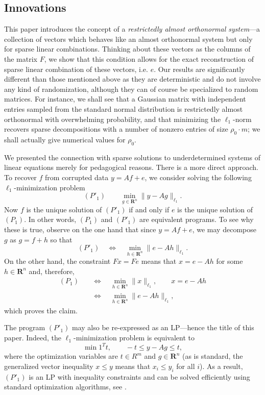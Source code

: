 \documentclass[11pt]{article}
\def\R{{{\mathbf{R}}}} %
\def\emph#1{{\it #1}} \def\textbf#1{{\bf #1}}
\newcommand{\<}{\langle}
\renewcommand{\>}{\rangle}
\numberwithin{equation}{section}
\begin{document}
\subsection{Innovations}


This paper introduces the concept of a \emph{restrictedly almost
  orthonormal system}---a collection of vectors which behaves like an
almost orthonormal system but only for sparse linear combinations.
Thinking about these vectors as the columns of the matrix $F$, we show
that this condition allows for the exact reconstruction of sparse
linear combination of these vectors, i.e. $e$. Our results are
significantly different than those mentioned above as they are
deterministic and do not involve any kind of randomization, although
they can of course be specialized to random matrices.  For instance,
we shall see that a Gaussian matrix with independent entries sampled
from the standard normal distribution is restrictedly almost
orthonormal with overwhelming probability, and that minimizing the
$\ell_1$-norm recovers sparse decompositions with a number of nonzero
entries of size $\rho_0 \cdot m$; we shall actually give numerical
values for $\rho_0$.

We presented the connection with sparse solutions to underdetermined
systems of linear equations merely for pedagogical reasons. There is a
more direct approach. To recover $f$ from corrupted data $y = Af + e$,
we consider solving the following $\ell_1$-minimization problem
\begin{equation}
  \label{eq:P1a}
  (P'_1) \quad \quad  \min_{g \in \R^n} \|y - A g\|_{\ell_1}.
\end{equation}
Now $f$ is the unique solution of $(P'_1)$ if and only if $e$ is the
unique solution of $(P_1)$. In other words, $(P_1)$ and $(P'_1)$ are
equivalent programs. To see why these is true, observe on the one hand
that since $y = Af + e$, we may decompose $g$ as $g = f + h$ so that
\[
(P'_1) \quad \Leftrightarrow  \quad \min_{h \in \R^n} 
\|e - A h\|_{\ell_1}.
\] 
On the other hand, the constraint $F x = F e$ means that $x = e - A h$
for some $h \in \R^n$ and, therefore,
\begin{align*}
  (P_1) \quad & \Leftrightarrow  \quad \min_{h \in \R^n} 
\|x\|_{\ell_1}, \qquad x = e - A h\\
& \Leftrightarrow  \quad \min_{h \in \R^n} 
\|e - Ah\|_{\ell_1},
\end{align*}
which proves the claim. 

The program $(P'_1)$ may also be re-expressed as an LP---hence the
title of this paper. Indeed, the $\ell_1$-minimization problem is
equivalent to
\begin{equation}
   \label{eq:LP}
   \min  1^T t , \qquad -t \le y - A g \le t, 
\end{equation}
where the optimization variables are $t \in R^m$ and $g \in \R^n$ (as
is standard, the generalized vector inequality $x \le y$ means that
$x_i \le y_i$ for all $i$).  As a result, $(P'_1)$ is an LP with
inequality constraints and can be solved efficiently using standard
optimization algorithms, see \cite{BoydBook}.
\end{document}
